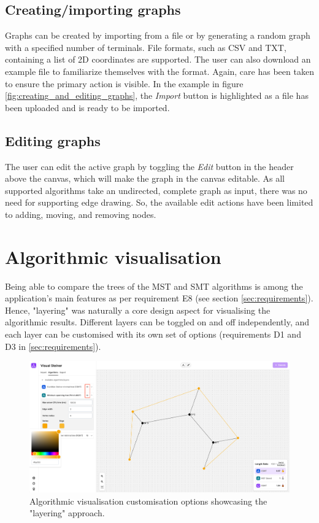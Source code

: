 \documentclass{l4proj}
\begin{document}
\subsection{Creating/importing graphs}
Graphs can be created by importing from a file or by generating a random graph with a specified number of terminals.
File formats, such as CSV and TXT, containing a list of 2D coordinates are supported. The user can also download an example file to familiarize themselves with the format.
Again, care has been taken to ensure the primary action is visible. In the example in figure \ref{fig:creating_and_editing_graphs}, the \textit{Import} button is highlighted as a file has been uploaded and is ready to be imported.

\subsection{Editing graphs}
The user can edit the active graph by toggling the \textit{Edit} button in the header above the canvas, which will make the graph in the canvas editable. As all supported algorithms take an undirected, complete graph as input, there was no need for supporting edge drawing. So, the available edit actions have been limited to adding, moving, and removing nodes.

\section{Algorithmic visualisation}
Being able to compare the trees of the MST and SMT algorithms is among the application's main features as per requirement E8 (see section \ref{sec:requirements}). Hence, "layering" was naturally a core design aspect for visualising the algorithmic results. Different layers can be toggled on and off independently, and each layer can be customised with its own set of options (requirements D1 and D3 in \ref{sec:requirements}).
\begin{figure}[hp]
    \centering
    \begin{tcolorbox}[colframe=gray!20, colback=gray!5, boxrule=1pt, arc=0mm, boxsep=0pt, left=0pt, right=0pt, top=0pt, bottom=0pt]
        \includegraphics[width=\textwidth]{images/algorithm_visualisation.png}
    \end{tcolorbox}

    \caption{Algorithmic visualisation customisation options showcasing the "layering" approach.}
    \label{fig:algorithm_visualisation}
\end{figure}
\end{document}
